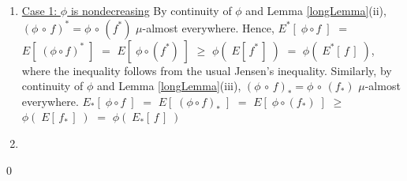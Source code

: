 \begin{enumerate}
\item
	\underline{Case 1: $\phi$ is nondecreasing}
	\vskip 0.0cm
	\noindent
	By continuity of $\phi$ and Lemma \ref{longLemma}(ii),
	$(\phi\,\circ\,f)^{*} = \phi\,\circ\,(f^{*})$ $\mu$-almost everywhere.
	Hence, $E^{*}\!\left[\;\phi \circ f\;\right]$
		$=$ $E\!\left[\;(\phi \circ f)^{*}\;\right]$
		$=$ $E\!\left[\;\phi \circ (f^{*})\;\right]$
		$\geq$ $\phi(\;E[\,f^{*}\,]\;)$
		$=$ $\phi(\;E^{*}[\,f\,]\;)$,
	where the inequality follows from the usual Jensen's inequality.
	\vskip 0.1cm
	\noindent
	Similarly, by continuity of $\phi$ and Lemma \ref{longLemma}(iii),
	$(\phi\,\circ\,f)_{*} = \phi\,\circ\,(f_{*})$ $\mu$-almost everywhere.
	$E_{*}\!\left[\;\phi \circ f\;\right]$
		$=$ $E\!\left[\;(\phi \circ f)_{*}\;\right]$
		$=$ $E\!\left[\;\phi \circ (f_{*})\;\right]$
		$\geq$ $\phi(\;E[\,f_{*}\,]\;)$
		$=$ $\phi(\;E_{*}[\,f\,]\;)$
\item
\end{enumerate}

\qed



\renewcommand{\theenumi}{\roman{enumi}}
\renewcommand{\labelenumi}{\textnormal{(\theenumi)}$\;\;$}

